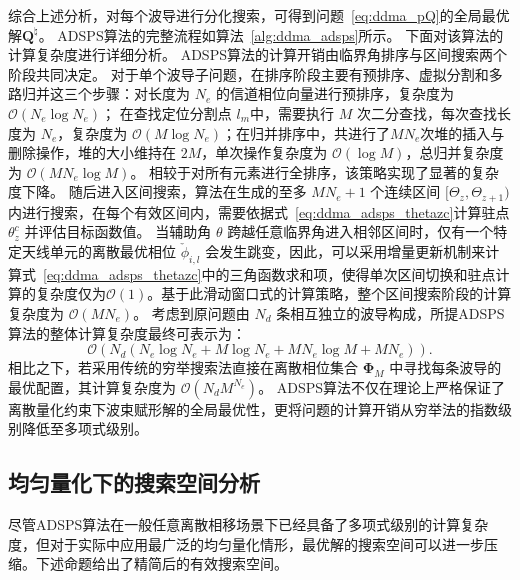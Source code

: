 综合上述分析，对每个波导进行分化搜索，可得到问题~\eqref{eq:ddma_pQ}的全局最优解$\bm Q^{\natural}$。
ADSPS算法的完整流程如算法~\ref{alg:ddma_adsps}所示。
下面对该算法的计算复杂度进行详细分析。
ADSPS算法的计算开销由临界角排序与区间搜索两个阶段共同决定。
对于单个波导子问题，在排序阶段主要有预排序、虚拟分割和多路归并这三个步骤：对长度为 $N_e$ 的信道相位向量进行预排序，复杂度为 $\mathcal{O}(N_e \log N_e)$；
在查找定位分割点 $l_m$中，需要执行 $M$ 次二分查找，每次查找长度为 $N_e$，复杂度为 $\mathcal{O}(M \log N_e)$；在归并排序中，共进行了$MN_e$次堆的插入与删除操作，堆的大小维持在 $2M$，单次操作复杂度为 $\mathcal{O}(\log M)$，总归并复杂度为 $\mathcal{O}(MN_e \log M)$。
相较于对所有元素进行全排序，该策略实现了显著的复杂度下降。
随后进入区间搜索，算法在生成的至多 $MN_e+1$ 个连续区间 $[\Theta_z, \Theta_{z+1})$ 内进行搜索，在每个有效区间内，需要依据式~\eqref{eq:ddma_adsps_thetazc}计算驻点 $\theta_z^c$ 并评估目标函数值。
当辅助角 $\theta$ 跨越任意临界角进入相邻区间时，仅有一个特定天线单元的离散最优相位 $\check{\phi}_{i,l}$ 会发生跳变，因此，可以采用增量更新机制来计算式~\eqref{eq:ddma_adsps_thetazc}中的三角函数求和项，使得单次区间切换和驻点计算的复杂度仅为$\mathcal{O}(1)$。基于此滑动窗口式的计算策略，整个区间搜索阶段的计算复杂度为 $\mathcal{O}(MN_e)$。
考虑到原问题由 $N_d$ 条相互独立的波导构成，所提ADSPS算法的整体计算复杂度最终可表示为：
\begin{equation}\label{eq:ddma_adsps_complexity}
	\mathcal{O}\left( N_d (N_e \log N_e + M \log N_e + MN_e \log M + MN_e) \right).
\end{equation}
相比之下，若采用传统的穷举搜索法直接在离散相位集合 $\bm \Phi_M$ 中寻找每条波导的最优配置，其计算复杂度为 $\mathcal{O}(N_d M^{N_e})$。
ADSPS算法不仅在理论上严格保证了离散量化约束下波束赋形解的全局最优性，更将问题的计算开销从穷举法的指数级别降低至多项式级别。

\subsection{均匀量化下的搜索空间分析}

尽管ADSPS算法在一般任意离散相移场景下已经具备了多项式级别的计算复杂度，但对于实际中应用最广泛的均匀量化情形，最优解的搜索空间可以进一步压缩。下述命题给出了精简后的有效搜索空间。

